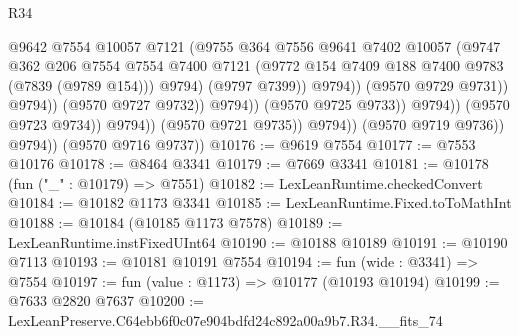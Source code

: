 \begin{lexlean}{R34}
\begin{coremodule}
                                              @9642
                                              @7554
                                              @10057
                                              @7121
                                              (@9755
                                                @364
                                                @7556
                                                @9641
                                                @7402
                                                @10057
                                                (@9747
                                                  @362
                                                  @206
                                                  @7554
                                                  @7554
                                                  @7400
                                                  @7121
                                                  (@9772
                                                    @154
                                                    @7409
                                                    @188
                                                    @7400
                                                    @9783
                                                    (@7839 (@9789 @154)))
                                                  @9794)
                                                (@9797 @7399))
                                              @9794))
                                          (@9570 @9729 @9731))
                                        @9794))
                                    (@9570 @9727 @9732))
                                  @9794))
                              (@9570 @9725 @9733))
                            @9794))
                        (@9570 @9723 @9734))
                      @9794))
                  (@9570 @9721 @9735))
                @9794))
            (@9570 @9719 @9736))
          @9794))
      (@9570 @9716 @9737))
@10176 := @9619 @7554
@10177 := @7553 @10176
@10178 := @8464 @3341
@10179 := @7669 @3341
@10181 := @10178 (fun ("_" : @10179) => @7551)
@10182 := LexLeanRuntime.checkedConvert
@10184 := @10182 @1173 @3341
@10185 := LexLeanRuntime.Fixed.toToMathInt
@10188 := @10184 (@10185 @1173 @7578)
@10189 := LexLeanRuntime.instFixedUInt64
@10190 := @10188 @10189
@10191 := @10190 @7113
@10193 := @10181 @10191 @7554
@10194 := fun (wide : @3341) => @7554
@10197 := fun (value : @1173) => @10177 (@10193 @10194)
@10199 := @7633 @2820 @7637
@10200 := LexLeanPreserve.C64ebb6f0c07e904bdfd24c892a00a9b7.R34.__fits_74

\end{coremodule}
\end{lexlean}
